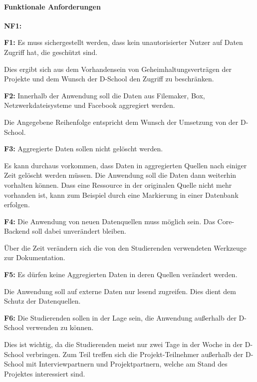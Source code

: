 \paragraph{Funktionale Anforderungen}
\label{sec:functional}
\begin{labeling}{\textbf{NF1:}}
  \item[\textbf{F1:}] Es muss sichergestellt werden, dass kein unautorisierter Nutzer auf Daten Zugriff hat, die geschützt sind.

  Dies ergibt sich aus dem Vorhandensein von Geheimhaltungsverträgen der Projekte und dem Wunsch der D-School den Zugriff zu beschränken. 

  \item[\textbf{F2:}] Innerhalb der Anwendung soll die Daten aus Filemaker, Box, Netzwerkdateisysteme und Facebook aggregiert werden.

  Die Angegebene Reihenfolge entspricht dem Wunsch der Umsetzung von der D-School.

  \item[\textbf{F3:}] Aggregierte Daten sollen nicht gelöscht werden. 

  Es kann durchaus vorkommen, dass Daten in aggregierten Quellen nach einiger Zeit gelöscht werden müssen. Die Anwendung soll die Daten dann weiterhin vorhalten können. Dass eine Ressource in der originalen Quelle nicht mehr vorhanden ist, kann zum Beispiel durch eine Markierung in einer Datenbank erfolgen.

  \item[\textbf{F4:}] Die Anwendung von neuen Datenquellen muss möglich sein. Das Core-Backend soll dabei unverändert bleiben.

  Über die Zeit verändern sich die von den Studierenden verwendeten Werkzeuge zur Dokumentation. 

  \item[\textbf{F5:}] Es dürfen keine Aggregierten Daten in deren Quellen verändert werden.

  Die Anwendung soll auf externe Daten nur lesend zugreifen. Dies dient dem Schutz der Datenquellen.

  \item[\textbf{F6:}] Die Studierenden sollen in der Lage sein, die Anwendung außerhalb der D-School verwenden zu können. 

  Dies ist wichtig, da die Studierenden meist nur zwei Tage in der Woche in der D-School verbringen. Zum Teil treffen sich die Projekt-Teilnehmer außerhalb der D-School mit Interviewpartnern und Projektpartnern, welche am Stand des Projektes interessiert sind. 
\end{labeling}

